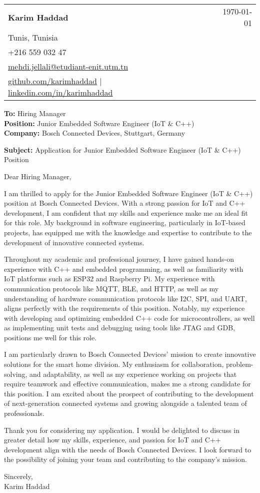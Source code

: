\documentclass[letterpaper,11pt]{article}
\makeatletter
\newcommand{\letterHeading}[5]{
    \begin{tabular*}{\textwidth}{l@{\extracolsep{\fill}}r}
    \textbf{\Large #1} & #5 \\  %
    #2 & \\
    #3 & \\
    #4 & \\
    \end{tabular*}
    \vspace{15pt}
}
\newcommand{\letterRecipient}[3]{
    \textbf{\large To:} #1 \\
    \textbf{\large Position:} #2 \\
    \textbf{\large Company:} #3 \\
    \vspace{12pt}
}
\newcommand{\letterSubject}[1]{
    \textbf{\large Subject:} #1 \\
    \vspace{15pt}
}
\makeatother
\begin{document}
    \letterHeading
    {Karim Haddad}
    {Tunis, Tunisia}
    {+216 559 032 47 \\ \href{mailto:mehdi.jellali@etudiant-enit.utm.tn}{mehdi.jellali@etudiant-enit.utm.tn}}
    {\href{https://github.com/karimhaddad}{github.com/karimhaddad} $|$ \href{https://www.linkedin.com/in/karimhaddad}{linkedin.com/in/karimhaddad}}
    {\today}

    \letterRecipient
    {Hiring Manager}
    {Junior Embedded Software Engineer (IoT & C++)}
    {Bosch Connected Devices, Stuttgart, Germany}

    \letterSubject{Application for Junior Embedded Software Engineer (IoT & C++) Position}

    Dear Hiring Manager,

    I am thrilled to apply for the Junior Embedded Software Engineer (IoT & C++) position at Bosch Connected Devices. With a strong passion for IoT and C++ development, I am confident that my skills and experience make me an ideal fit for this role. My background in software engineering, particularly in IoT-based projects, has equipped me with the knowledge and expertise to contribute to the development of innovative connected systems.

    Throughout my academic and professional journey, I have gained hands-on experience with C++ and embedded programming, as well as familiarity with IoT platforms such as ESP32 and Raspberry Pi. My experience with communication protocols like MQTT, BLE, and HTTP, as well as my understanding of hardware communication protocols like I2C, SPI, and UART, aligns perfectly with the requirements of this position. Notably, my experience with developing and optimizing embedded C++ code for microcontrollers, as well as implementing unit tests and debugging using tools like JTAG and GDB, positions me well for this role.

    I am particularly drawn to Bosch Connected Devices' mission to create innovative solutions for the smart home division. My enthusiasm for collaboration, problem-solving, and adaptability, as well as my experience working on projects that require teamwork and effective communication, makes me a strong candidate for this position. I am excited about the prospect of contributing to the development of next-generation connected systems and growing alongside a talented team of professionals.

    Thank you for considering my application. I would be delighted to discuss in greater detail how my skills, experience, and passion for IoT and C++ development align with the needs of Bosch Connected Devices. I look forward to the possibility of joining your team and contributing to the company's mission.

    Sincerely,\\[12pt]

    Karim Haddad
\end{document}
